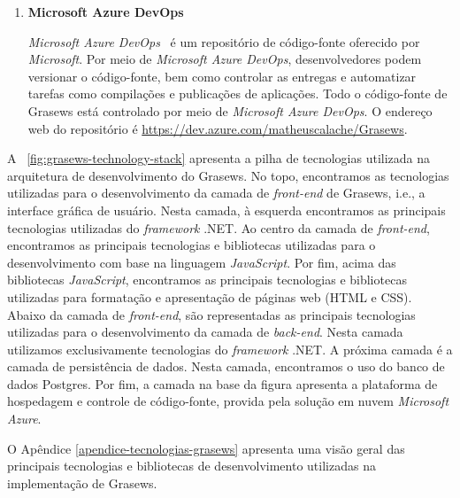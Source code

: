 \begin{enumerate}
  
  \item \textbf{Microsoft Azure DevOps}
  
  \textit{Microsoft Azure DevOps}~\cite{MICROSOFT-2019-DEVOPS} é um repositório de código-fonte oferecido por \textit{Microsoft}. Por meio de \textit{Microsoft Azure DevOps}, desenvolvedores podem versionar o código-fonte, bem como controlar as entregas e automatizar tarefas como compilações e publicações de aplicações. Todo o código-fonte de Grasews está controlado por meio de \textit{Microsoft Azure DevOps}. O endereço web do repositório é \href{https://dev.azure.com/matheuscalache/Grasews}{https://dev.azure.com/matheuscalache/Grasews}.
  
  
\end{enumerate}

A \figurename~\ref{fig:grasews-technology-stack} apresenta a pilha de tecnologias utilizada na arquitetura de desenvolvimento do Grasews. No topo, encontramos as tecnologias utilizadas para o desenvolvimento da camada de \textit{front-end} de Grasews, i.e., a interface gráfica de usuário. Nesta camada, à esquerda encontramos as principais tecnologias utilizadas do \textit{framework} .NET. Ao centro da camada de \textit{front-end}, encontramos as principais tecnologias e bibliotecas utilizadas para o desenvolvimento com base na linguagem \textit{JavaScript}. Por fim, acima das bibliotecas \textit{JavaScript}, encontramos as principais tecnologias e bibliotecas utilizadas para formatação e apresentação de páginas web (HTML e CSS). Abaixo da camada de \textit{front-end}, são representadas as principais tecnologias utilizadas para o desenvolvimento da camada de \textit{back-end}. Nesta camada utilizamos exclusivamente tecnologias do \textit{framework} .NET. A próxima camada é a camada de persistência de dados. Nesta camada, encontramos o uso do banco de dados Postgres. Por fim, a camada na base da figura apresenta a plataforma de hospedagem e controle de código-fonte, provida pela solução em nuvem \textit{Microsoft Azure}.

O Apêndice \ref{apendice-tecnologias-grasews} apresenta uma visão geral das principais tecnologias e bibliotecas de desenvolvimento utilizadas na implementação de Grasews.

